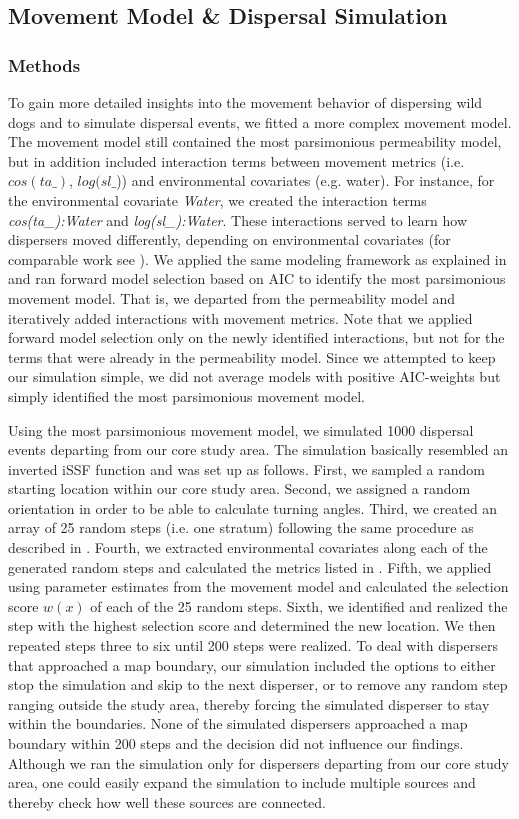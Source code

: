 \documentclass[abstract=on,10pt,a4paper,bibliography=totocnumbered]{scrartcl}
\begin{document}
\newpage
\subsection{Movement Model \& Dispersal Simulation}
\label{Appendix:DispersalSimulation}
\subsubsection{Methods}
To gain more detailed insights into the movement behavior of dispersing wild
dogs and to simulate dispersal events, we fitted a more complex movement model.
The movement model still contained the most parsimonious permeability model, but
in addition included interaction terms between movement metrics (i.e.
\(cos(ta\_)\), \(log(sl\_\))) and environmental covariates (e.g. water). For
instance, for the environmental covariate \textit{Water}, we created the
interaction terms \textit{cos(ta\_):Water} and \textit{log(sl\_):Water}. These
interactions served to learn how dispersers moved differently, depending on
environmental covariates (for comparable work see \cite{Prokopenko.2017}). We
applied the same modeling framework as explained in  and ran
forward model selection based on AIC to identify the most parsimonious movement
model. That is, we departed from the permeability model and iteratively added
interactions with movement metrics. Note that we applied forward model selection
only on the newly identified interactions, but not for the terms that were
already in the permeability model. Since we attempted to keep our simulation
simple, we did not average models with positive AIC-weights but simply
identified the most parsimonious movement model.

Using the most parsimonious movement model, we simulated 1000 dispersal events
departing from our core study area. The simulation basically resembled an
inverted iSSF function and was set up as follows. First, we sampled a random
starting location within our core study area. Second, we assigned a random
orientation in order to be able to calculate turning angles. Third, we created
an array of 25 random steps (i.e. one stratum) following the same procedure as
described in . Fourth, we extracted environmental covariates
along each of the generated random steps and calculated the metrics listed in
. Fifth, we applied  using parameter estimates
from the movement model and calculated the selection score \(w(x)\) of each of
the 25 random steps. Sixth, we identified and realized the step with the highest
selection score and determined the new location. We then repeated steps three to
six until 200 steps were realized. To deal with dispersers that approached a map
boundary, our simulation included the options to either stop the simulation and
skip to the next disperser, or to remove any random step ranging outside the
study area, thereby forcing the simulated disperser to stay within the
boundaries. None of the simulated dispersers approached a map boundary within
200 steps and the decision did not influence our findings. Although we ran the
simulation only for dispersers departing from our core study area, one could
easily expand the simulation to include multiple sources and thereby check how
well these sources are connected.
\end{document}
